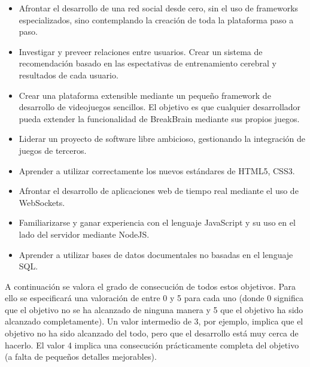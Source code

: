 \begin{itemize}
\item Afrontar el desarrollo de una red social desde cero, sin el uso de frameworks especializados, sino contemplando la creación de toda la plataforma paso a paso.
\item Investigar y preveer relaciones entre usuarios. Crear un sistema de recomendación basado en las espectativas de entrenamiento cerebral y resultados de cada usuario.
\item Crear una plataforma extensible mediante un pequeño framework de desarrollo de videojuegos sencillos. El objetivo es que cualquier desarrollador pueda extender la funcionalidad de BreakBrain mediante sus propios juegos.
\item Liderar un proyecto de software libre ambicioso, gestionando la integración de juegos de terceros.
\item Aprender a utilizar correctamente los nuevos estándares de HTML5, CSS3.
\item Afrontar el desarrollo de aplicaciones web de tiempo real mediante el uso de WebSockets.
\item Familiarizarse y ganar experiencia con el lenguaje JavaScript y su uso en el lado del servidor mediante NodeJS.
\item Aprender a utilizar bases de datos documentales no basadas en el lenguaje SQL.
\end{itemize}

A continuación se valora el grado de consecución de todos estos objetivos. Para ello se especificará una valoración de entre 0 y 5 para cada uno (donde 0 significa que el objetivo no se ha alcanzado de ninguna manera y 5 que el objetivo ha sido alcanzado completamente). Un valor intermedio de 3, por ejemplo, implica que el objetivo no ha sido alcanzado del todo, pero que el desarrollo está muy cerca de hacerlo. El valor 4 implica una consecución prácticamente completa del objetivo (a falta de pequeños detalles mejorables).



